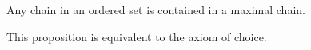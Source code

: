 \documentclass[12pt]{article}
\begin{document}
Any chain in an ordered set is contained in a maximal chain.

This proposition is equivalent to the axiom of choice.
\end{document}
